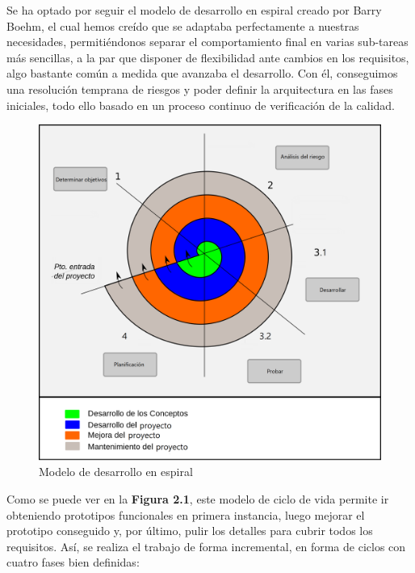 Se ha optado por seguir el modelo de desarrollo en espiral creado por Barry Boehm, el cual hemos creído que se adaptaba perfectamente a nuestras necesidades, permitiéndonos separar el comportamiento final en varias sub-tareas más sencillas, a la par que disponer de flexibilidad ante cambios en los requisitos, algo bastante común a medida que avanzaba el desarrollo. Con él, conseguimos una resolución temprana de riesgos y poder definir la arquitectura en las fases iniciales, todo ello basado en un proceso continuo de verificación de la calidad.

\begin{figure}[H]
  \begin{center}
    \includegraphics[width=0.9\linewidth]{figures/modelo_espiral.png}
		\caption{Modelo de desarrollo en espiral}
		\label{fig.espiral}
		\end{center}
\end{figure}

Como se puede ver en la \textbf{Figura 2.1}, este modelo de ciclo de vida permite ir obteniendo prototipos funcionales en primera instancia, luego mejorar el prototipo conseguido y, por último, pulir los detalles para cubrir todos los requisitos.  Así, se realiza el trabajo de forma incremental, en forma de ciclos con cuatro fases bien definidas:

